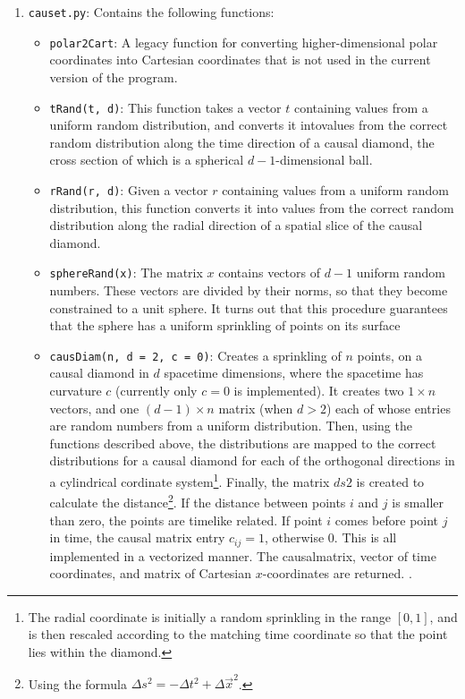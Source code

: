 \documentclass[letterpaper,10pt]{article}
\def\code#1{\texttt{#1}}
\begin{document}
\begin{enumerate}
 \item \code{causet.py}: Contains the following functions:
 \begin{itemize}
  \item \code{polar2Cart}: A legacy function for converting higher-dimensional polar coordinates into Cartesian coordinates that is not used in the 
  current version of the program.
  \item \code{tRand(t, d)}: This function takes a vector $t$ containing values from a uniform random distribution, and converts it intovalues from  the correct 
  random distribution along the time direction of a causal diamond, the cross section of which is a spherical $d-1$-dimensional ball. 
  \item \code{rRand(r, d)}: Given a vector $r$ containing values from a uniform random distribution, this function converts it into values from the correct 
  random distribution along the radial direction of a spatial slice of the causal diamond.
  \item \code{sphereRand(x)}: The matrix $x$ contains vectors of $d-1$ uniform random numbers.  These vectors are divided by their norms, so that they 
  become constrained to a unit sphere.  It turns out that this procedure guarantees that the sphere has a uniform sprinkling of points on its surface
  \item \code{causDiam(n, d = 2, c = 0)}:  Creates a sprinkling of $n$ points, on a causal diamond in $d$ spacetime dimensions, where the spacetime has 
  curvature $c$ (currently only $c=0$ is implemented).  It creates two $1\times n$ vectors, and one $(d-1)\times n$ matrix (when $d>2$) each of 
  whose entries are random numbers from a uniform distribution.  Then, using the functions described above, the distributions are mapped to the correct 
  distributions for a causal diamond for each of the orthogonal directions in a cylindrical cordinate system\footnote{The radial coordinate is initially 
  a random sprinkling in the range $[0, 1]$, and is then rescaled according to the matching time coordinate so that the point lies within the diamond.}.  
  Finally, the matrix $ds2$ is created to calculate the distance\footnote{Using the formula $\Delta s^2 = -\Delta t^2 + \Delta\vec{x}^2$.}.  If the distance 
  between points $i$ and $j$ is smaller than zero, the points are timelike related.  If point $i$ comes before point $j$ in time, the causal matrix entry 
  $c_{ij} = 1$, otherwise $0$.  This is all implemented in a vectorized manner.  The causalmatrix, vector of time coordinates, and matrix of Cartesian 
  $x$-coordinates are returned.
  \cite{cubetosphere}.
 \end{itemize}

\end{enumerate}
\end{document}
